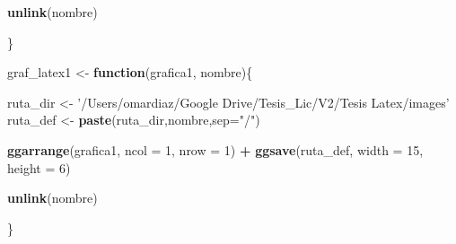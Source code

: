 \documentclass[]{book}
\newenvironment{Shaded}{\begin{snugshade}}{\end{snugshade}}
\newcommand{\KeywordTok}[1]{\textcolor[rgb]{0.13,0.29,0.53}{\textbf{#1}}}
\newcommand{\DataTypeTok}[1]{\textcolor[rgb]{0.13,0.29,0.53}{#1}}
\newcommand{\DecValTok}[1]{\textcolor[rgb]{0.00,0.00,0.81}{#1}}
\newcommand{\StringTok}[1]{\textcolor[rgb]{0.31,0.60,0.02}{#1}}
\newcommand{\ControlFlowTok}[1]{\textcolor[rgb]{0.13,0.29,0.53}{\textbf{#1}}}
\newcommand{\OperatorTok}[1]{\textcolor[rgb]{0.81,0.36,0.00}{\textbf{#1}}}
\newcommand{\NormalTok}[1]{#1}
\theoremstyle{definition}
\theoremstyle{definition}
\theoremstyle{definition}
\theoremstyle{remark}
\begin{document}
\begin{Shaded}
\begin{Highlighting}[]
  \KeywordTok{unlink}\NormalTok{(nombre)}
  
\NormalTok{\}}

\NormalTok{graf_latex1 <-}\StringTok{ }\ControlFlowTok{function}\NormalTok{(grafica1, nombre)\{}
  
\NormalTok{  ruta_dir <-}\StringTok{ '/Users/omardiaz/Google Drive/Tesis_Lic/V2/Tesis Latex/images'}
\NormalTok{  ruta_def <-}\StringTok{ }\KeywordTok{paste}\NormalTok{(ruta_dir,nombre,}\DataTypeTok{sep=}\StringTok{"/"}\NormalTok{)}
  
  \KeywordTok{ggarrange}\NormalTok{(grafica1, }\DataTypeTok{ncol =} \DecValTok{1}\NormalTok{, }\DataTypeTok{nrow =} \DecValTok{1}\NormalTok{) }\OperatorTok{+}
\StringTok{    }\KeywordTok{ggsave}\NormalTok{(ruta_def, }\DataTypeTok{width =} \DecValTok{15}\NormalTok{, }\DataTypeTok{height =} \DecValTok{6}\NormalTok{)}
  
  \KeywordTok{unlink}\NormalTok{(nombre)}
  
\NormalTok{\}}
\end{Highlighting}
\end{Shaded}
\end{document}

